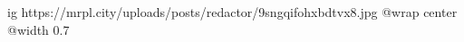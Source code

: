  
 
 
 
 

\ifcmt
  ig https://mrpl.city/uploads/posts/redactor/9sngqifohxbdtvx8.jpg
  @wrap center
  @width 0.7
\fi
